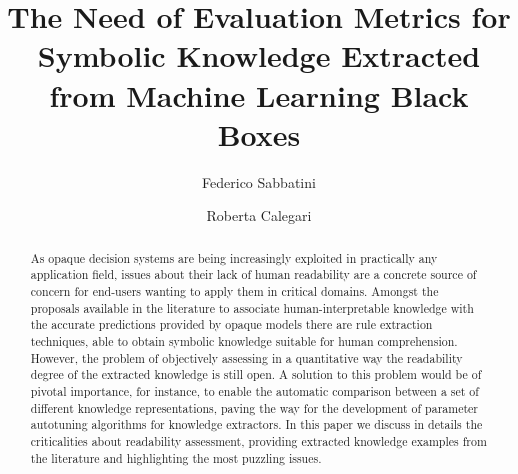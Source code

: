 \documentclass[sigconf]{acmart}
\begin{document}
\title{The Need of Evaluation Metrics for Symbolic Knowledge Extracted from Machine Learning Black Boxes}

\author{Federico Sabbatini}

\author{Roberta Calegari}

\renewcommand{\shortauthors}{F. Sabbatini, R. Calegari}

\begin{abstract}
  As opaque decision systems are being increasingly exploited in practically any application field, issues about their lack of human readability are a concrete source of concern for end-users wanting to apply them in critical domains.
  Amongst the proposals available in the literature to associate human-interpretable knowledge with the accurate predictions provided by opaque models there are rule extraction techniques, able to obtain symbolic knowledge suitable for human comprehension.
  However, the problem of objectively assessing in a quantitative way the readability degree of the extracted knowledge is still open.
  A solution to this problem would be of pivotal importance, for instance, to enable the automatic comparison between a set of different knowledge representations, paving the way for the development of parameter autotuning algorithms for knowledge extractors.
  In this paper we discuss in details the criticalities about readability assessment, providing extracted knowledge examples from the literature and highlighting the most puzzling issues.
\end{abstract}
\end{document}
